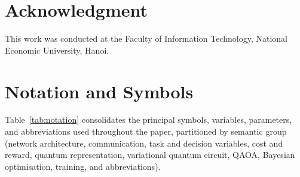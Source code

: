 \documentclass[11pt,a4paper]{article}
\theoremstyle{definition}
\begin{document}
\section*{Acknowledgment}

This work was conducted at the Faculty of Information Technology, National Economic University, Hanoi.

\appendix
\section{Notation and Symbols}
\label{app:notation}

Table~\ref{tab:notation} consolidates the principal symbols, variables, parameters, and abbreviations used throughout the paper, partitioned by semantic group (network architecture, communication, task and decision variables, cost and reward, quantum representation, variational quantum circuit, QAOA, Bayesian optimisation, training, and abbreviations).
\end{document}
